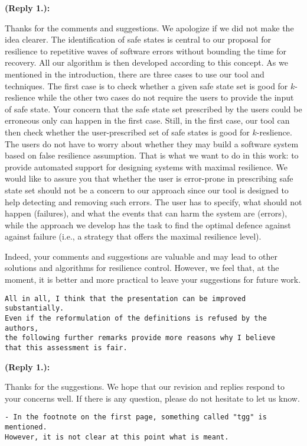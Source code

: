 \documentclass[times,10pt,twocolumn]{article}
\newcounter{cabbage0}
\newcounter{cabbage1}
\newcounter{cabbage2}
\newcounter{cabbage3}
\newcounter{bean0}
\newcounter{bean1}
\newcounter{bean2}
\newcounter{bean3}
\newcounter{bean4}
\newcounter{bean5}
\newcounter{bean6}
\newenvironment{reply1}{\begin{list}{\bf (Reply 1.\arabic{bean1}):} 
        {\usecounter{bean1}\setcounter{bean1}{\value{cabbage1}} \item \setcounter{cabbage1}{\value{bean1}} 
        }
}{\end{list}}
\begin{document}
\begin{reply1} 
Thanks for the comments and suggestions.  
We apologize if we did not make the idea clearer.  
The identification of safe states is central to our proposal for 
resilience to repetitive waves of software errors without bounding the 
time for recovery.  
All our algorithm is then developed according to this concept.  
As we mentioned in the introduction, there are three cases to use our tool 
and techniques.  
The first case is to check whether a given safe state set is good for 
$k$-reslience while the other two cases do not require the users to 
provide the input of safe state.  
Your concern that the safe state set prescribed by the users could be erroneous 
only can happen in the first case.  
Still, in the first case, our tool can then check whether the 
user-prescribed set of safe states is good for $k$-reslience.  
The users do not have to worry about whether they may build a software 
system based on false resilience assumption.  
That is what we want to do in this work: to provide automated support for 
designing systems with maximal resilience.  
We would like to assure you that whether the user is error-prone in prescribing 
safe state set should not be a concern to our approach since our tool is designed 
to help detecting and removing such errors.  
The user has to specify, what should not happen (failures), and what the events that can harm the system are (errors), while the approach we develop has the task to find the optimal defence against against failure (i.e., a strategy that offers the maximal resilience level).

Indeed, your comments and suggestions are valuable and may lead to 
other solutions and algorithms for resilience control.  
However, we feel that, at the moment, it is better and more practical to 
leave your suggestions for future work.  
\end{reply1} 
\begin{verbatim} 
All in all, I think that the presentation can be improved substantially. 
Even if the reformulation of the definitions is refused by the authors, 
the following further remarks provide more reasons why I believe 
that this assessment is fair. 
\end{verbatim}
\begin{reply1} 
Thanks for the suggestions. 
We hope that our revision and replies respond to your concerns well. 
If there is any question, please do not hesitate to let us know. 
\end{reply1} 
\begin{verbatim}
- In the footnote on the first page, something called "tgg" is mentioned. 
However, it is not clear at this point what is meant. 
\end{verbatim}
\end{document}

